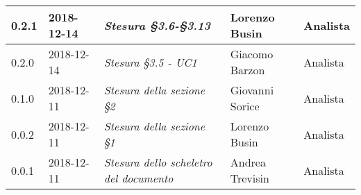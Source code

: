 \begin{longtable}{C{2cm}|C{2.5cm}|C{4.5cm}|C{2.5cm}|C{3cm}}
		0.2.1 & 2018-12-14 & \emph{Stesura §3.6-§3.13} & Lorenzo Busin & Analista \\
		\hline
		
		0.2.0 & 2018-12-14 & \emph{Stesura §3.5 - UC1} & Giacomo Barzon & Analista \\
		\hline
		
		0.1.0 & 2018-12-11 & \emph{Stesura della sezione §2} & Giovanni Sorice & Analista \\
		\hline
		
		0.0.2 & 2018-12-11 & \emph{Stesura della sezione §1} & Lorenzo Busin & Analista \\
		\hline
		
		0.0.1 & 2018-12-11 & \emph{Stesura dello scheletro del documento} & Andrea Trevisin & Analista \\
		
	\end{longtable}



\clearpage